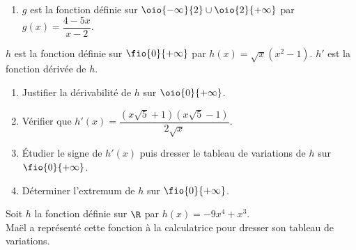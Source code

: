 \documentclass[a4paper,11pt,exos]{nsi} %
\begin{document}
\begin{enumerate}
	\item	$g$ est la fonction définie sur $\oio{-\infty}{2}\cup\oio{2}{+\infty}$ par $g(x)=\dfrac{4-5x}{x-2}$.
\end{enumerate}


\exo{}
$h$ est la fonction définie sur $\fio{0}{+\infty}$ par $h(x)=\sqrt{x}\left(x^2-1\right)$. $h'$ est la fonction dérivée de $h$.
\begin{enumerate}
	\item 	Justifier la dérivabilité de $h$ sur $\oio{0}{+\infty}$.
	\item 	Vérifier que $h'(x)=\dfrac{\left(x\sqrt{5}+1\right)\left(x\sqrt{5}-1\right)}{2\sqrt{x}}$.
	\item	\'Etudier le signe de $h'(x)$ puis dresser le tableau de variations de $h$ sur $\fio{0}{+\infty}$.
	\item	Déterminer l'extremum de $h$ sur $\fio{0}{+\infty}$.
\end{enumerate}


\exo{}
Soit $h$ la fonction définie sur $\R$ par $h(x)=-9x^4+x^3$.\\
Maël a représenté cette fonction à la calculatrice pour dresser son tableau de variations.
\end{document}
